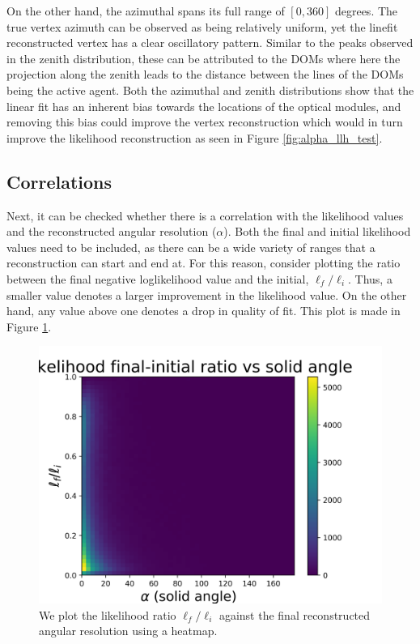On the other hand, the azimuthal spans its full range of $[0, 360]$ degrees. The true vertex azimuth can be observed as being relatively uniform, yet the linefit reconstructed vertex has a clear oscillatory pattern. Similar to the peaks observed in the zenith distribution, these can be attributed to the DOMs where here the projection along the zenith leads to the distance between the lines of the DOMs being the active agent. Both the azimuthal and zenith distributions show that the linear fit has an inherent bias towards the locations of the optical modules, and removing this bias could improve the vertex reconstruction which would in turn improve the likelihood reconstruction as seen in Figure \ref{fig:alpha_llh_test}.

\subsection{Correlations}

Next, it can be checked whether there is a correlation with the likelihood values and the reconstructed angular resolution ($\alpha$). Both the final and initial likelihood values need to be included, as there can be a wide variety of ranges that a reconstruction can start and end at. For this reason, consider plotting the ratio between the final negative loglikelihood value and the initial, $\ell_{f}/\ell_{i}$. Thus, a smaller value denotes a larger improvement in the likelihood value. On the other hand, any value above one denotes a drop in quality of fit. This plot is made in Figure \ref{fig:alpha_llhratio_comp}.

\begin{figure}[H]
  \centering
  \includegraphics[width=12cm]{./Figures/reco_plots/alpha_dist_vs_llhratio_heat.png}
  \caption{We plot the likelihood ratio $\ell_{f}/\ell_{i}$ against the final reconstructed angular resolution using a heatmap. }
  \label{fig:alpha_llhratio_comp}
\end{figure}

